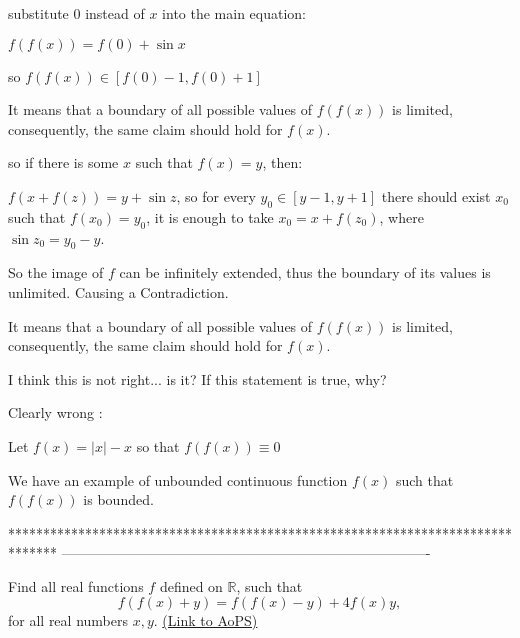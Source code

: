 \begin{mysolution}
	substitute $ 0$ instead of $ x$ into the main equation:

$ f(f(x)) = f(0) + \sin{x}$

so $ f(f(x))\in [f(0) - 1,f(0) + 1]$

It means that a boundary of all possible values of $ f(f(x))$ is limited, consequently, the same claim should hold for $ f(x)$.

so if there is some $ x$ such that $ f(x) = y$, then:

$ f(x + f(z)) = y + \sin{z}$, so for every $ y_0\in[y - 1,y + 1]$ there should exist $ x_0$ such that $ f(x_0) = y_0$, it is enough to take $ x_0 = x + f(z_0)$, where $ \sin{z_0} = y_0 - y$.

So the image of $ f$ can be infinitely extended, thus the boundary of its values is unlimited. Causing a Contradiction.
\end{mysolution}



\begin{mysolution}
	\begin{tcolorbox}
It means that a boundary of all possible values of $ f(f(x))$ is limited, consequently, the same claim should hold for $ f(x)$.
\end{tcolorbox}

I think this is not right... is it?
If this statement is true, why?
\end{mysolution}



\begin{mysolution}
	Clearly wrong :

Let $f(x)=|x|-x$ so that $f(f(x))\equiv 0$

We have an example of unbounded continuous function $f(x)$ such that $f(f(x))$ is bounded.



\end{mysolution}
*******************************************************************************
-------------------------------------------------------------------------------

\begin{problem}
	Find all real functions $f$ defined on $ \mathbb R$, such that  \[f(f(x)+y) = f(f(x)-y)+4f(x)y ,\] for all real numbers $x,y$.
	\flushright \href{https://artofproblemsolving.com/community/c6h146128}{(Link to AoPS)}
\end{problem}



